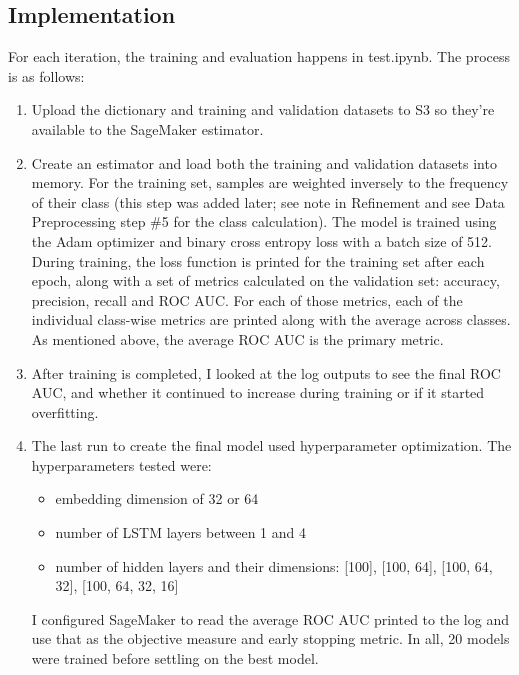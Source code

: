 \documentclass[12pt]{article}
\begin{document}
\subsection*{Implementation}
\label{sec:orgbb8ef0b}
For each iteration, the training and evaluation happens in test.ipynb. The process is as follows:
\begin{enumerate}
\item Upload the dictionary and training and validation datasets to S3 so they're available to the SageMaker estimator.
\item Create an estimator and load both the training and validation datasets into memory. For the training set, samples are weighted inversely to the frequency of their class (this step was added later; see note in Refinement and see Data Preprocessing step \#5 for the class calculation). The model is trained using the Adam optimizer and binary cross entropy loss with a batch size of 512. During training, the loss function is printed for the training set after each epoch, along with a set of metrics calculated on the validation set: accuracy, precision, recall and ROC AUC. For each of those metrics, each of the individual class-wise metrics are printed along with the average across classes. As mentioned above, the average ROC AUC is the primary metric.
\item After training is completed, I looked at the log outputs to see the final ROC AUC, and whether it continued to increase during training or if it started overfitting.
\item The last run to create the final model used hyperparameter optimization. The hyperparameters tested were:
\begin{itemize}
\item embedding dimension of 32 or 64
\item number of LSTM layers between 1 and 4
\item number of hidden layers and their dimensions: [100], [100, 64], [100, 64, 32], [100, 64, 32, 16]
\end{itemize}
I configured SageMaker to read the average ROC AUC printed to the log and use that as the objective measure and early stopping metric. In all, 20 models were trained before settling on the best model.
\end{enumerate}
\end{document}
